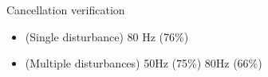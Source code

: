 \documentclass[10pt]{beamer}
\begin{document}
\begin{frame}{Cancellation verification}
  \begin{itemize}
    \item \alert(Single disturbance) 80 Hz (76\%)
    \item \alert(Multiple disturbances) 50Hz (75\%) 80Hz (66\%)
  \end{itemize}
  \vspace{-1cm}
  \begin{figure}[h]
    \centering
  \end{figure}
\end{frame}
\end{document}
